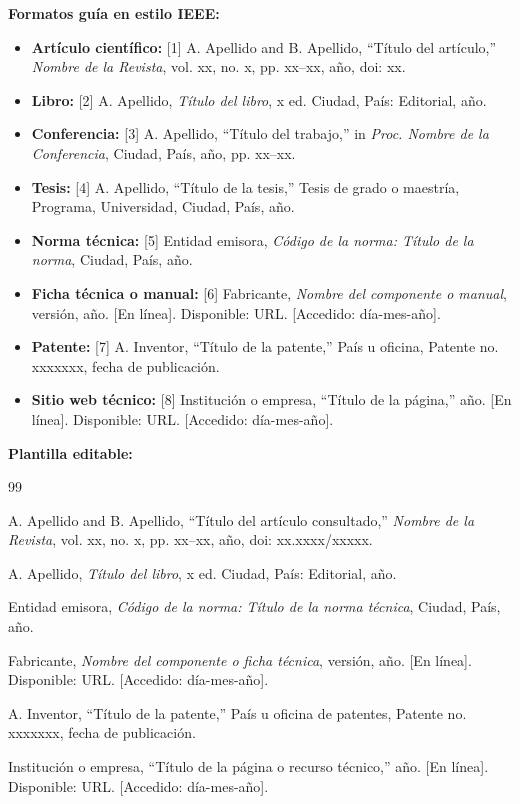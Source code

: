\documentclass[12pt,letterpaper]{report}
\begin{document}
\begin{instrucciones}
\vspace{2mm}
\noindent \textbf{Formatos guía en estilo IEEE:}

\begin{itemize}
  \item \textbf{Artículo científico:} [1] A. Apellido and B. Apellido, ``Título del artículo,'' \textsl{Nombre de la Revista}, vol. xx, no. x, pp. xx--xx, año, doi: xx.
  \item \textbf{Libro:} [2] A. Apellido, \textsl{Título del libro}, x ed. Ciudad, País: Editorial, año.
  \item \textbf{Conferencia:} [3] A. Apellido, ``Título del trabajo,'' in \textsl{Proc. Nombre de la Conferencia}, Ciudad, País, año, pp. xx--xx.
  \item \textbf{Tesis:} [4] A. Apellido, ``Título de la tesis,'' Tesis de grado o maestría, Programa, Universidad, Ciudad, País, año.
  \item \textbf{Norma técnica:} [5] Entidad emisora, \textsl{Código de la norma: Título de la norma}, Ciudad, País, año.
  \item \textbf{Ficha técnica o manual:} [6] Fabricante, \textsl{Nombre del componente o manual}, versión, año. [En línea]. Disponible: URL. [Accedido: día-mes-año].
  \item \textbf{Patente:} [7] A. Inventor, ``Título de la patente,'' País u oficina, Patente no. xxxxxxx, fecha de publicación.
  \item \textbf{Sitio web técnico:} [8] Institución o empresa, ``Título de la página,'' año. [En línea]. Disponible: URL. [Accedido: día-mes-año].
\end{itemize}

\vspace{2mm}
\noindent \textbf{Plantilla editable:}
\end{instrucciones}

\begin{thebibliography}{99}

A. Apellido and B. Apellido, ``Título del artículo consultado,'' \textsl{Nombre de la Revista}, vol. xx, no. x, pp. xx--xx, año, doi: xx.xxxx/xxxxx.

A. Apellido, \textsl{Título del libro}, x ed. Ciudad, País: Editorial, año.

Entidad emisora, \textsl{Código de la norma: Título de la norma técnica}, Ciudad, País, año.

Fabricante, \textsl{Nombre del componente o ficha técnica}, versión, año. [En línea]. Disponible: URL. [Accedido: día-mes-año].

A. Inventor, ``Título de la patente,'' País u oficina de patentes, Patente no. xxxxxxx, fecha de publicación.

Institución o empresa, ``Título de la página o recurso técnico,'' año. [En línea]. Disponible: URL. [Accedido: día-mes-año].

\end{thebibliography}
\end{document}

